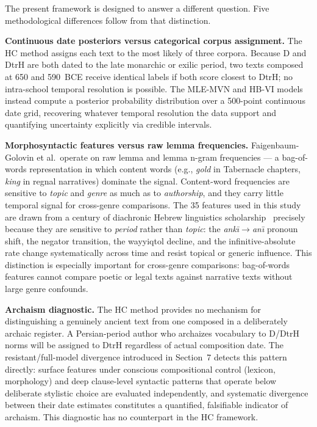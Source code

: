 \documentclass[10pt,letterpaper]{article}
\newcommand{\mvn}{MLE-MVN}
\newcommand{\hbvi}{HB-VI}
\begin{document}
The present framework is designed to answer a different question.
Five methodological differences follow from that distinction.

\textbf{Continuous date posteriors versus categorical corpus assignment.}
The HC method assigns each text to the most likely of three corpora.
Because D and DtrH are both dated to the late monarchic or exilic period,
two texts composed at 650 and 590~BCE receive identical labels if both
score closest to DtrH; no intra-school temporal resolution is possible.
The \mvn{} and \hbvi{} models instead compute a posterior probability
distribution over a 500-point continuous date grid, recovering whatever
temporal resolution the data support and quantifying uncertainty explicitly
via credible intervals.

\textbf{Morphosyntactic features versus raw lemma frequencies.}
Faigenbaum-Golovin et al.\ operate on raw lemma and lemma n-gram
frequencies --- a bag-of-words representation in which content words
(e.g., \textit{gold} in Tabernacle chapters, \textit{king} in regnal
narratives) dominate the signal.  Content-word frequencies are sensitive
to \emph{topic} and \emph{genre} as much as to \emph{authorship}, and
they carry little temporal signal for cross-genre comparisons.  The 35
features used in this study are drawn from a century of diachronic Hebrew
linguistics scholarship~\cite{Hurvitz1982,Polzin1976,Rooker1990,Young2008}
precisely because they are sensitive to \emph{period} rather than
\emph{topic}: the \textit{ank\={\i}}$\to$\textit{an\={\i}} pronoun shift,
the negator transition, the wayyiqtol decline, and the
infinitive-absolute rate change systematically across time and resist
topical or generic influence.  This distinction is especially important
for cross-genre comparisons: bag-of-words features cannot compare poetic
or legal texts against narrative texts without large genre confounds.

\textbf{Archaism diagnostic.}
The HC method provides no mechanism for distinguishing a genuinely ancient
text from one composed in a deliberately archaic register.  A Persian-period
author who archaizes vocabulary to D/DtrH norms will be assigned to
DtrH regardless of actual composition date.  The resistant/full-model
divergence introduced in Section~7 detects this pattern directly: surface
features under conscious compositional control (lexicon, morphology) and
deep clause-level syntactic patterns that operate below deliberate stylistic
choice are evaluated independently, and systematic divergence between their
date estimates constitutes a quantified, falsifiable indicator of archaism.
This diagnostic has no counterpart in the HC framework.
\end{document}
